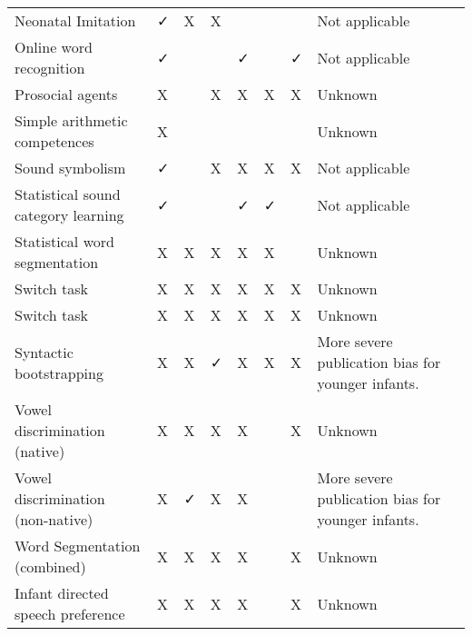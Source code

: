 \documentclass[
]{article}
\begin{document}
\begin{table}[tbp]
\begin{center}
\begin{threeparttable}
\begin{tabular}{llllllll}
Neonatal Imitation & ✓ & X & X &  &  &  & Not applicable\\
Online word recognition & ✓ &  &  & ✓ &  & ✓ & Not applicable\\
Prosocial agents & X &  & X & X & X & X & Unknown\\
Simple arithmetic competences & X &  &  &  &  &  & Unknown\\
Sound symbolism & ✓ &  & X & X & X & X & Not applicable\\
Statistical sound category learning & ✓ &  &  & ✓ & ✓ &  & Not applicable\\
Statistical word segmentation & X & X & X & X & X &  & Unknown\\
Switch task & X & X & X & X & X & X & Unknown\\
Switch task & X & X & X & X & X & X & Unknown\\
Syntactic bootstrapping & X & X & ✓ & X & X & X & More severe publication bias for younger infants.\\
Vowel discrimination (native) & X & X & X & X &  & X & Unknown\\
Vowel discrimination (non-native) & X & ✓ & X & X &  &  & More severe publication bias for younger infants.\\
Word Segmentation (combined) & X & X & X & X &  & X & Unknown\\
Infant directed speech preference & X & X & X & X &  & X & Unknown\\
\bottomrule
\end{tabular}

\end{threeparttable}
\end{center}

\end{table}
\end{document}
